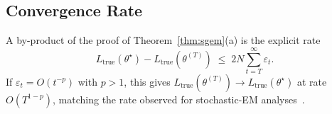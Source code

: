 \subsection{Convergence Rate}

A by-product of the proof of Theorem~\ref{thm:sgem}(a) is the
explicit rate
\begin{equation}
L_{\mathrm{true}}(\theta^{\star}) - L_{\mathrm{true}}(\theta^{(T)})
\;\leq\; 2N \sum_{t = T}^{\infty} \varepsilon_t.
\end{equation}
If $\varepsilon_t = O(t^{-p})$ with $p > 1$, this gives
$L_{\mathrm{true}}(\theta^{(T)}) \to L_{\mathrm{true}}(\theta^{\star})$
at rate $O(T^{1 - p})$, matching the rate observed for stochastic-EM
analyses~\cite{cappe2009online}.
